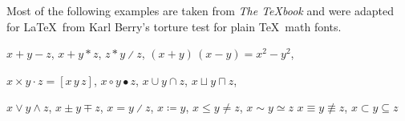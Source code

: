 	\def\testloweri{%
	  \test a \test b \test c \test d \test e \test f \test g \test h
	  \test i \test j \test k \test l \test m }
	\def\testlowerii{%
	  \test n \test o \test p \test q \test r \test s \test t \test u
	  \test v \test w \test x \test y \test z }
	\def\testlower{%
	  \testloweri\testlowerii}

	\def\testupgreeki{%
	  \test A \test B \test\Gamma \test\Delta \test E \test Z \test H
	  \test\Theta \test I \test K \test\Lambda \test M }
	\def\testupgreekii{%
	  \test N \test\Xi \test O \test\Pi \test P \test\Sigma \test T
	  \test\Upsilon \test\Phi \test X \test\Psi \test\Omega }
	\def\testupgreek{%
	  \testupgreeki\testupgreekii}

	\def\testlowgreeki{%
	  \test\alpha \test\beta \test\gamma \test\delta \test\epsilon
	  \test\zeta \test\eta \test\theta \test\iota \test\kappa \test\lambda
	  \test\mu }
	\def\testlowgreekii{%
	  \test\nu \test\xi \test o \test\pi \test\rho \test\sigma \test\tau
	  \test\upsilon \test\phi \test\chi \test\psi \test\omega }
	\def\testlowgreekiii{%
	  \test\varepsilon \test\vartheta \test\varpi \test\varrho
	  \test\varsigma \test\varphi}
	\def\testlowgreek{%
	  \testlowgreeki\testlowgreekii\testlowgreekiii}

	\def\testlowgreekupi{%
	  \test\upalpha \test\upbeta \test\upgamma \test\updelta \test\upepsilon
	  \test\upzeta \test\upeta \test\uptheta \test\upiota \test\upkappa \test\uplambda
	  \test\upmu }
	\def\testlowgreekupii{%
	  \test\upnu \test\upxi \test o \test\uppi \test\uprho \test\upsigma \test\uptau
	  \test\upupsilon \test\upphi \test\upchi \test\uppsi \test\upomega }
	\def\testlowgreekupiii{%
	  \test\upvarepsilon \test\upvartheta \test\upvarpi \test\upvarrho
	  \test\upvarsigma \test\upvarphi}
	\def\testlowgreekup{%
	  \testlowgreekupi\testlowgreekupii\testlowgreekupiii}

	\newcommand{\showfamily}{}

	Most of the following examples are taken from \textit{The \TeX book} \citep[][see \url{https://ctan.org/pkg/texbook}]{knuth:ct:a} and were adapted for \LaTeX\ from Karl Berry's torture test for plain \TeX\ math fonts.

	\noindent $x + y - z$, \quad $x + y * z$, \quad $z * y \divslash z$, \quad
	$(x+y)\,(x-y) = x^2 - y^2$,

	\noindent $x \times y \cdot z = [x\, y\, z]$, \quad $x\circ y \bullet z$, \quad
	$x\cup y \cap z$, \quad $x\sqcup y \sqcap z$, \quad

	\noindent $x \vee y \wedge z$, \quad $x\pm y\mp z$, \quad
	$x=y \divslash z$, \;\; $x \coloneqq y$, \;\; $x\le y \ne z$, \;\; $x \sim y \simeq z$
	$x \equiv y \nequiv z$, \;\; $x\subset y \subseteq z$

